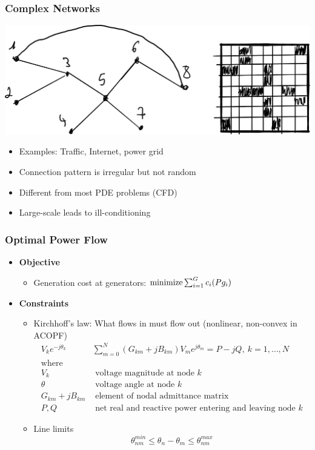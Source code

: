 \begin{frame}
  \frametitle{Complex Networks}
  \includegraphics[width=\textwidth]{figures/complexn}
  \begin{itemize}
    \item Examples: Traffic, Internet, power grid
    \item Connection pattern is irregular but not random
    \item Different from most PDE problems (CFD)
    \item Large-scale leads to ill-conditioning
  \end{itemize}
\end{frame}

\begin{frame}[fragile]
  \frametitle{Optimal Power Flow}
  \begin{itemize}
    \item {\bf Objective}
    \begin{itemize}
      \item Generation cost at generators:
      $ \minimize \sum^G_{i=1} c_i(Pg_i)$
    \end{itemize}
    \item {\bf Constraints}
    \begin{itemize}
      \item Kirchhoff's law: What flows in must flow out (nonlinear, non-convex in ACOPF)
      \begin{align*}
        V_k e^{-j\theta_k} & \sum^{N}_{m=0} (G_{km} + jB_{km})V_m e^{j\theta_m} = P - jQ,\ k = 1, \dots, N \\
        \text{where}\\
        V_k &\text{ voltage magnitude at node } k\\
        \theta &\text{ voltage angle at node } k\\
        G_{km} + jB_{km}& \text{ element of nodal admittance matrix}\\
        P, Q &\text{ net real and reactive power entering and leaving node } k
      \end{align*}
      \item Line limits \\
      $$ \theta^{min}_{nm} \leq \theta_n - \theta_m \leq \theta^{max}_{nm}$$
    \end{itemize}
  \end{itemize}
\end{frame}

